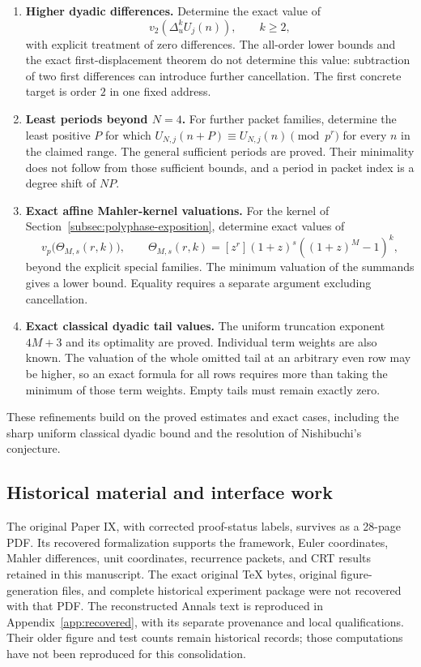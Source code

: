 \begin{enumerate}
\item \textbf{Higher dyadic differences.}
Determine the exact value of
\[
v_2\!\left(\Delta_u^kU_j(n)\right),\qquad k\geq2,
\]
with explicit treatment of zero differences. The all-order lower bounds and
the exact first-displacement theorem do not determine this value: subtraction
of two first differences can introduce further cancellation. The first
concrete target is order $2$ in one fixed address.

\item \textbf{Least periods beyond $N=4$.}
For further packet families, determine the least positive $P$ for which
$U_{N,j}(n+P)\equiv U_{N,j}(n)\pmod{p^r}$ for every $n$ in the claimed range.
The general sufficient periods are proved. Their minimality does not follow
from those sufficient bounds, and a period in packet index is a degree shift
of $NP$.

\item \textbf{Exact affine Mahler-kernel valuations.}
For the kernel of Section~\ref{subsec:polyphase-exposition}, determine exact
values of
\[
v_p\bigl(\Theta_{M,s}(r,k)\bigr),\qquad
\Theta_{M,s}(r,k)=[z^r](1+z)^s((1+z)^M-1)^k,
\]
beyond the explicit special families. The minimum valuation of the summands
gives a lower bound. Equality requires a separate argument excluding
cancellation.

\item \textbf{Exact classical dyadic tail values.}
The uniform truncation exponent $4M+3$ and its optimality are proved.
Individual term weights are also known. The valuation of the whole omitted
tail at an arbitrary even row may be higher, so an exact formula for all rows
requires more than taking the minimum of those term weights. Empty tails
must remain exactly zero.
\end{enumerate}

These refinements build on the proved estimates and exact cases, including
the sharp uniform classical dyadic bound and the resolution of Nishibuchi's
conjecture.

\subsection{Historical material and interface work}
\label{subsec:historical-scope}

The original Paper IX, with corrected proof-status labels, survives as a
28-page PDF. Its recovered formalization supports the framework, Euler
coordinates, Mahler differences,
unit coordinates, recurrence packets, and CRT results retained in this
manuscript. The exact original TeX bytes, original figure-generation files, and complete
historical experiment package were not recovered with that PDF.
The reconstructed Annals text is reproduced in Appendix~\ref{app:recovered},
with its separate provenance and local qualifications. Their older
figure and test counts remain historical records; those computations have
not been reproduced for this consolidation.

